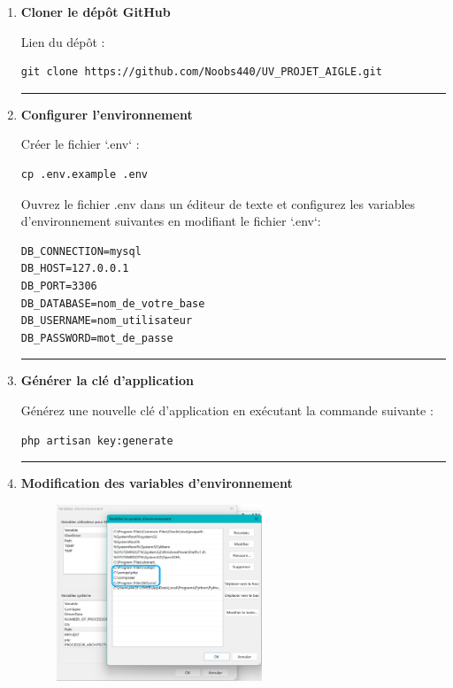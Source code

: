 \documentclass[12pt]{article}
\begin{document}
\begin{enumerate}
    \item \textbf{Cloner le dépôt GitHub}

Lien du dépôt :
        \begin{lstlisting}
git clone https://github.com/Noobs440/UV_PROJET_AIGLE.git
        \end{lstlisting}
\rule{\linewidth}{0.2pt}
    \item \textbf{Configurer l’environnement}

Créer le fichier `.env` :
        \begin{lstlisting}
cp .env.example .env
        \end{lstlisting}
Ouvrez le fichier .env dans un éditeur de texte et configurez les variables d'environnement suivantes
en modifiant le fichier `.env`:
        \begin{lstlisting}
DB_CONNECTION=mysql
DB_HOST=127.0.0.1
DB_PORT=3306
DB_DATABASE=nom_de_votre_base
DB_USERNAME=nom_utilisateur
DB_PASSWORD=mot_de_passe
        \end{lstlisting}
\rule{\linewidth}{0.2pt}
    \item \textbf{Générer la clé d'application}

Générez une nouvelle clé d'application en exécutant la commande suivante :
        \begin{lstlisting}
php artisan key:generate
        \end{lstlisting}
\rule{\linewidth}{0.2pt}
    \item \textbf{Modification des variables d’environnement}
        \begin{figure}[h] 
            \centering 
            \includegraphics[width=0.58\textwidth]{./img/path.png} 
        \end{figure}


\end{enumerate}
\end{document}
